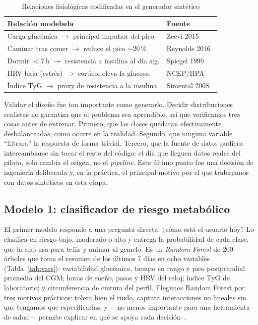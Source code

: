 \documentclass[9pt,letterpaper,twocolumn]{extarticle}
\begin{document}
\begin{table}[t]
\caption{Relaciones fisiológicas codificadas en el generador sintético}
\label{tab:fisio}
\centering
\footnotesize
\begin{tabularx}{\columnwidth}{@{}Xl@{}}
\toprule
\textbf{Relación modelada} & \textbf{Fuente}\\
\midrule
Carga glucémica $\to$ principal impulsor del pico & Zeevi 2015~\cite{zeevi}\\
Caminar tras comer $\to$ reduce el pico $\sim$20\,\% & Reynolds 2016~\cite{reynolds}\\
Dormir $<$7\,h $\to$ resistencia a insulina al día sig. & Spiegel 1999~\cite{spiegel}\\
HRV baja (estrés) $\to$ cortisol eleva la glucosa & NCEP/HPA~\cite{ncep}\\
Índice TyG $\to$ proxy de resistencia a la insulina & Simental 2008~\cite{tyg}\\
\bottomrule
\end{tabularx}
\end{table}

Validar el diseño fue tan importante como generarlo. Decidir distribuciones
realistas no garantiza que el problema sea aprendible, así que verificamos tres
cosas antes de entrenar. Primero, que las clases quedaran efectivamente
desbalanceadas, como ocurre en la realidad. Segundo, que ninguna variable
``filtrara'' la respuesta de forma trivial. Tercero, que la fuente de datos
pudiera intercambiarse sin tocar el resto del código: el día que lleguen datos
reales del piloto, solo cambia el origen, no el \emph{pipeline}. Este último
punto fue una decisión de ingeniería deliberada y, en la práctica, el principal
motivo por el que trabajamos con datos sintéticos en esta etapa.

\subsection{Modelo 1: clasificador de riesgo metabólico}
El primer modelo responde a una pregunta directa: ¿cómo está el usuario hoy? Lo
clasifica en riesgo bajo, moderado o alto y entrega la probabilidad de cada
clase, que la app usa para teñir y animar al gemelo. Es un \emph{Random Forest}
de 200 árboles que toma el resumen de los últimos 7 días en ocho variables
(Tabla~\ref{tab:vars}): variabilidad glucémica, tiempo en rango y pico
postprandial promedio del CGM; horas de sueño, pasos y HRV del reloj; índice TyG
de laboratorio; y circunferencia de cintura del perfil. Elegimos Random Forest
por tres motivos prácticos: tolera bien el ruido, captura interacciones no
lineales sin que tengamos que especificarlas, y ---no menos importante para una
herramienta de salud--- permite explicar en qué se apoya cada
decisión~\cite{breiman}.
\end{document}
